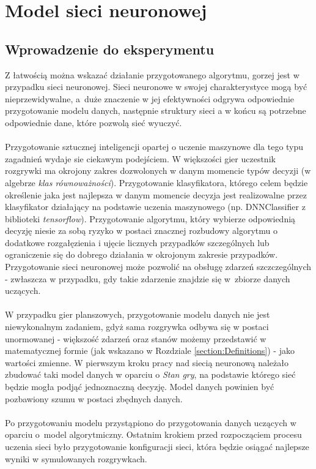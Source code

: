 \documentclass[12pt, oneside]{report}
\begin{document}
\chapter{Model sieci neuronowej}
\section{Wprowadzenie do eksperymentu}
Z łatwością można wskazać działanie przygotowanego algorytmu, gorzej jest w przypadku sieci neuronowej. Sieci neuronowe w swojej charakterystyce mogą być nieprzewidywalne, a~duże znaczenie w jej efektywności odgrywa odpowiednie przygotowanie modelu danych, następnie struktury sieci a w końcu są potrzebne odpowiednie dane, które pozwolą sieć wyuczyć. \\ \\
Przygotowanie sztucznej inteligencji opartej o uczenie maszynowe dla tego typu zagadnień wydaje sie ciekawym podejściem. W większości gier uczestnik rozgrywki ma okrojony zakres dozwolonych w danym momencie typów decyzji (w algebrze  \textit{klas równoważności}). Przygotowanie klasyfikatora, którego celem będzie określenie jaka jest najlepsza w danym momencie decyzja jest realizowalne przez klasyfikator działający na podstawie uczenia maszynowego (np. DNNClassifier z biblioteki \textit{tensorflow}). Przygotowanie algorytmu, który wybierze odpowiednią decyzję niesie za sobą ryzyko w postaci znacznej rozbudowy algorytmu o dodatkowe rozgałęzienia i ujęcie licznych przypadków szczególnych lub ograniczenie się do dobrego działania w okrojonym zakresie przypadków. Przygotowanie sieci neuronowej może pozwolić na obsługę zdarzeń szczczególnych - zwłaszcza w przypadku, gdy takie zdarzenie znajdzie się w~zbiorze danych uczących.
 \\ \\ W przypadku gier planszowych, przygotowanie modelu danych nie jest niewykonalnym zadaniem, gdyż sama rozgrywka odbywa się w postaci unormowanej - większość zdarzeń oraz stanów możemy przedstawić w matematycznej formie (jak wskazano w Rozdziale \ref{section:Definitions}) - jako wartości zmienne. W pierwszym kroku pracy nad siecią neuronową należało zbudować taki model danych w oparciu o \textit{Stan gry}, na podstawie którego sieć będzie mogła podjąć jednoznaczną decyzję. Model danych powinien być pozbawiony szumu w postaci zbędnych danych.
 \\ \\ Po przygotowaniu modelu przystąpiono do przygotowania danych uczących w oparciu o~model algorytmiczny. Ostatnim krokiem przed rozpocząciem procesu uczenia sieci było przygotowanie konfiguracji sieci, która będzie osiągać najlepsze wyniki w symulowanych rozgrywkach.
\end{document}
